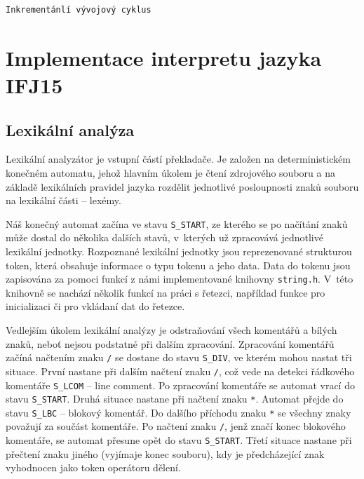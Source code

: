 \documentclass[a4paper, 12pt]{article}
\begin{document}
\begin{verbatim}
Inkrementánlí vývojový cyklus
\end{verbatim}

\newpage

\section{Implementace interpretu jazyka IFJ15} \label{implementace}
\subsection{Lexikální analýza} \label{lexer}

Lexikální analyzátor je vstupní částí překladače. Je založen na deterministickém
konečném automatu, jehož hlavním úkolem je čtení zdrojového souboru a na základě
lexikálních pravidel jazyka rozdělit jednotlivé posloupnosti znaků
souboru na lexikální části  -- lexémy.

Náš konečný automat začína ve stavu \texttt{S\_START}, ze kterého se po načítání
znaků může dostal do několika dalších stavů, v~kterých už zpracovává jednotlivé
lexikální jednotky. Rozpoznané lexikální jednotky jsou reprezenované strukturou
token, která obsahuje informace o typu tokenu a jeho data. Data do tokenu jsou
zapisována za pomoci funkcí z námi implementované knihovny \texttt{string.h}.
V~této knihovně se nachází několik funkcí na práci s řetezci, například funkce
pro inicializaci či pro vkládaní dat do řetezce.

Vedlejším úkolem
lexikální analýzy je odstraňování všech komentářů a bílých znaků, neboť nejsou
podstatné při dalším zpracování. Zpracování komentářů začíná načtením
znaku \texttt{/} se dostane do stavu \texttt{S\_DIV}, ve kterém mohou nastat
tři situace. První nastane při dalším načtení znaku \texttt{/}, což vede na
detekci řádkového komentáře \texttt{S\_LCOM} -- line comment. Po zpracování
komentáře se automat vrací do stavu \texttt{S\_START}. Druhá situace nastane při
načtení znaku \texttt{*}. Automat přejde do stavu \texttt{S\_LBC} -- blokový
komentář. Do dalšího příchodu znaku \texttt{*} se všechny znaky považují
za součást komentáře. Po načtení znaku \texttt{/}, jenž značí konec
blokového komentáře, se automat přesune opět do stavu \texttt{S\_START}.
Třetí situace nastane při přečtení znaku jiného (vyjímaje konec
souboru), kdy je předcházející znak vyhodnocen jako token operátoru dělení.
\end{document}
